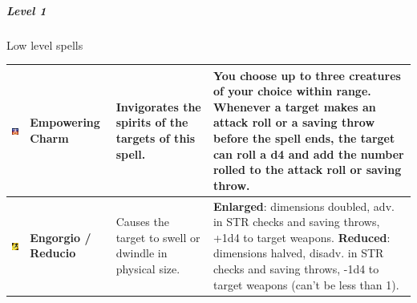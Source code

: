 \subparagraph{Level 1} 
Low level spells \\
\begin{tabular}{ m{2cm}m{3cm}m{4cm}m{6cm} } \hline
	\includegraphics[width=2cm]{../Pictures/Gameplay/Spells/Icon/Empowering_spell_icon.png} & \textbf{Empowering Charm} & Invigorates the spirits of the targets of this spell. & You choose up to three creatures of your choice within range. Whenever a target makes an attack roll or a saving throw before the spell ends, the target can roll a d4 and add the number rolled to the attack roll or saving throw. \\ \hline
\includegraphics[width=2cm]{../Pictures/Gameplay/Spells/Icon/Engorgio_spell_icon.png} & \textbf{Engorgio / Reducio} & Causes the target to swell or dwindle in physical size. & \textbf{Enlarged}: dimensions doubled, adv. in STR checks and saving throws, +1d4 to target weapons. \textbf{Reduced}: dimensions halved, disadv. in STR checks and saving throws, -1d4 to target weapons (can't be less than 1).  \\ \hline
\end{tabular}

